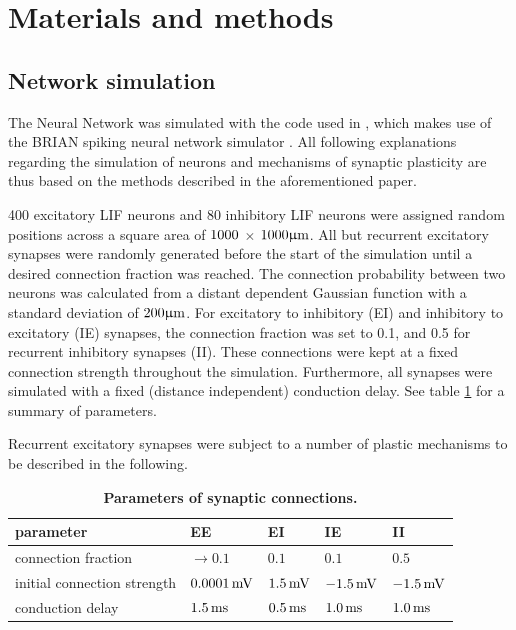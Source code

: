 \documentclass[10pt,letterpaper]{article}
\begin{document}
\section*{Materials and methods}
\subsection*{Network simulation} \label{network simulation}

The Neural Network was simulated with the code used in \cite{SORN_Paper}, which makes use of the BRIAN spiking neural network simulator \cite{Briansim}. All following explanations regarding the simulation of neurons and mechanisms of synaptic plasticity are thus based on the methods described in the aforementioned paper.

400 excitatory LIF neurons and 80 inhibitory LIF neurons were assigned random positions across a square area of $\rm 1000$ $\times$  $1000 \rm \upmu m$. All but recurrent excitatory synapses were randomly generated before the start of the simulation until a desired connection fraction was reached. The connection probability between two neurons was calculated from a distant dependent Gaussian function with a standard deviation of $\rm 200 \upmu m$. For excitatory to inhibitory (EI) and inhibitory to excitatory (IE) synapses, the connection fraction was set to 0.1, and 0.5 for recurrent inhibitory synapses (II). These connections were kept at a fixed connection strength throughout the simulation. Furthermore, all synapses were simulated with a fixed (distance independent) conduction delay. See table \ref{syn_conn_params} for a summary of parameters.

Recurrent excitatory synapses were subject to a number of plastic mechanisms to be described in the following. 

\begin{table}
\caption{\bf Parameters of synaptic connections.}
\begin{tabular}{|l|l|l|l|l|}
\hline
\textbf{parameter} & \textbf{EE} & \textbf{EI} & \textbf{IE} & \textbf{II} \\ \hline
connection fraction & $\rightarrow 0.1$ & $0.1$ & $0.1$ & $0.5$ \\ \hline
initial connection strength & $\rm 0.0001\, mV$ & $\rm 1.5\, mV$ & $\rm -1.5\, mV$ & $\rm -1.5\, mV$ \\ \hline
conduction delay & $\rm 1.5\, ms$ & $\rm 0.5\, ms$ & $\rm 1.0\, ms$ & $\rm 1.0\, ms$ \\
\hline
\end{tabular}
\label{syn_conn_params}
\end{table}
\newpage
\end{document}
